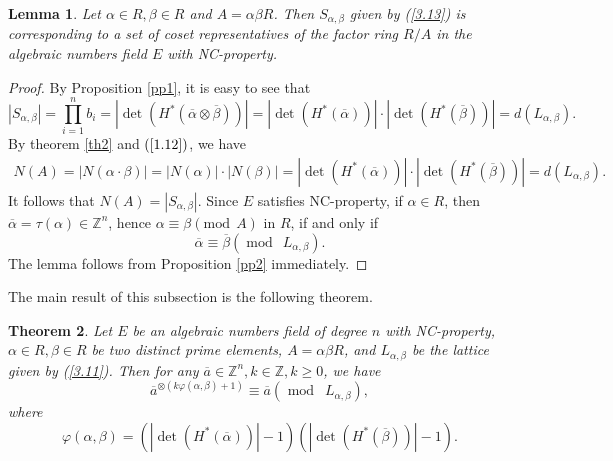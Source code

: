 \documentclass [11pt]{article}
\newtheorem{thm}{\bf Theorem}[section]
\newtheorem{lem}[thm]{\bf Lemma}
\begin{document}
\begin{lem}\label{lm3.2}
 Let $\alpha \in R, \beta \in R$ and $A=\alpha \beta R$. Then $S_{\alpha, \beta} $ given by (\ref{3.13}) is corresponding to a set of coset representatives of the factor ring $R/A$ in the algebraic numbers field $E$  with  NC-property.
\end{lem}


\begin{proof}
 By Proposition \ref{pp1}, it is  easy  to see that
$$
\left|S_{\alpha, \beta}\right|=\prod_{i=1}^{n} b_{i} =\left|\operatorname{det}\left(H^{*}(\overline{\alpha} \otimes \overline{\beta})\right)\right| =\left| \operatorname{det}\left(H^{*}(\overline{\alpha})\right) \right|  \cdot \left| \operatorname{det}\left(H^{*}(\overline{\beta})\right) \right|=d\left(L_{\alpha, \beta}\right).
$$
By theorem \ref{th2} and $(\ref{1.12})$, we have
$$
\begin{aligned}
N(A) =|N(\alpha  \cdot  \beta)|=| N( \alpha)| \cdot | N(\beta) |= \left| \operatorname{det}\left(H^{*}(\overline{\alpha})\right)\right|\cdot\left| \operatorname{det}\left(H^{*}(\overline{\beta})\right)\right|
=d\left(L_{\alpha, \beta}\right).
\end{aligned}
$$
It follows that $N(A)=\left|S_{\alpha, \beta}\right|$. Since $E$ satisfies NC-property, if $\alpha \in R$, then $\overline{\alpha}=\tau(\alpha) \in \mathbb{Z}^{n}$, hence $\alpha \equiv \beta(\text{mod}\ \ A)$ in $R$, if and only  if
$$
\overline{\alpha} \equiv \overline{\beta}\left(\operatorname{mod}\ \  L_{\alpha, \beta}\right) .
$$
The lemma follows from Proposition \ref{pp2} immediately.
 \end{proof}

The main result of this subsection is the following theorem.

\begin{thm} \label{th3}  Let $E$ be an algebraic numbers field of degree  $n$ with NC-property, $\alpha \in R, \beta \in R$ be two distinct prime elements, $A=\alpha \beta R$, and $L_{\alpha, \beta}$ be the lattice given  by (\ref{3.11}). Then for any $\overline{a} \in \mathbb{Z}^{n}, k \in \mathbb{Z}, k \geq 0$, we have
\begin{equation}\label{3.14}
\overline{a}^{\otimes(k \varphi(\alpha, \beta)+1)}\equiv \overline{a} \left(\text { mod } \ \ L_{\alpha, \beta}\right),
\end{equation}
where
\begin{equation}\label{3.15}
\varphi(\alpha, \beta)=\left( \left|\operatorname{det}\left(H^{*}(\overline{\alpha})\right)\right|-1\right) \left( \left|\operatorname{det}\left(H^{*}(\overline{\beta})\right)\right|-1\right) .
\end{equation}
\end{thm}
\end{document}
